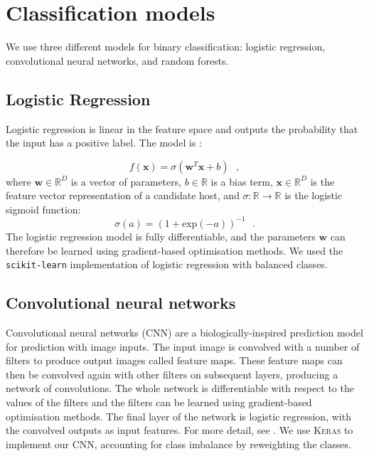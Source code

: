 \documentclass[fleqn,usenatbib,usedcolumn]{mnras}
\renewcommand{\vec}[1]{\mathbf{#1}}
\newcommand{\edited}[1]{#1}
\begin{document}
\appendix

\section{Classification models}\label{app:models}

  We use three different models for binary classification: logistic
  regression, convolutional neural networks, and random forests.

  \subsection{Logistic Regression}
  \label{sec:logistic-regression}
    Logistic regression is linear in the feature space and outputs the
    probability that the input has a positive label. The model is
    \citep{bishop06ml}:

    \begin{equation}
        f(\vec x) = \sigma(\vec w^T \vec x + b) \,\,\,\,,
    \end{equation}
    where $\vec w \in \mathbb{R}^D$ is a vector of parameters, $b \in \mathbb{R}$ is a bias term, $\vec x \in \mathbb{R}^D$ is the feature vector representation of a candidate host, and $\sigma : \mathbb{R} \to \mathbb{R}$ is the logistic sigmoid function: \begin{equation}
        \sigma(a) = (1 + \mathrm{exp}(-a))^{-1}\,\,\,\,.
    \end{equation}%
    The logistic regression model is fully differentiable, and the parameters
    $\vec w$ can therefore be learned using gradient-based optimisation
    methods. \edited{We used the \texttt{scikit-learn} \citep{pedregosa11sklearn}
    implementation of logistic regression with balanced classes}.

  \subsection{Convolutional neural networks}
  \label{sec:convolutional-neural-networks}

    Convolutional neural networks (CNN) are a biologically-inspired prediction
    model for prediction with image inputs. The input image is convolved with
    a number of filters to produce output images called feature maps. These
    feature maps can then be convolved again with other filters on subsequent
    layers, producing a network of convolutions. The whole network is
    differentiable with respect to the values of the filters and the filters
    can be learned using gradient-based optimisation methods. The final layer
    of the network is logistic regression, with the convolved outputs as input
    features. For more detail, see \citet[subsection II.A][]{lecun98}. We use
    \textsc{Keras} \citep{chollet15keras} to implement our CNN, accounting for
    class imbalance by reweighting the classes.
\end{document}
